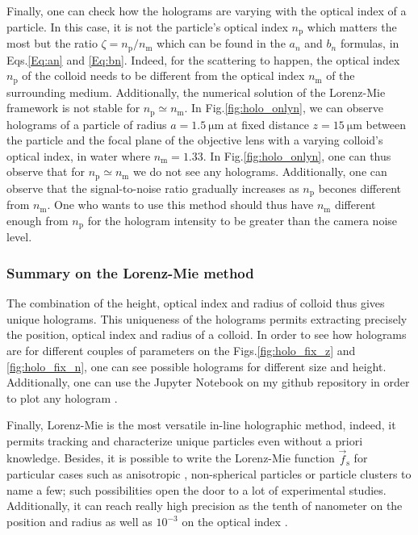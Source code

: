 Finally, one can check how the holograms are varying with the optical index of a particle. In this case, it is not the particle's optical index $n_\mathrm{p}$ which matters the most but the ratio $\zeta = n_\mathrm{p} / n_\mathrm{m} $ which can be found in the $a_n$ and $b_n$ formulas, in Eqs.\ref{Eq:an} and \ref{Eq:bn}. Indeed, for the scattering to happen, the optical index $n_\mathrm{p}$ of the colloid needs to be different from the optical index $n_\mathrm{m}$ of the surrounding medium. Additionally, the numerical solution of the Lorenz-Mie framework is not stable for $n_\mathrm{p} \simeq n_\mathrm{m}$. In Fig.\ref{fig:holo_onlyn}, we can observe holograms of a particle of radius $a = 1.5 ~ \mathrm{\mu m}$ at fixed distance $z=15 ~ \mathrm{\mu m}$ between the particle and the focal plane of the objective lens with a varying colloid's optical index, in water where $n_\mathrm{m} = 1.33$. In Fig.\ref{fig:holo_onlyn}, one can thus observe that for  $n_\mathrm{p} \simeq n_\mathrm{m}$ we do not see any holograms.  Additionally, one can observe that the signal-to-noise ratio gradually increases as $n_\mathrm{p}$ becones different from $n_\mathrm{m}$. One who wants to use this method should thus have $n_\mathrm{m}$ different enough from $n_\mathrm{p}$ for the hologram intensity to be greater than the camera noise level.






\subsubsection{Summary on the Lorenz-Mie method}

The combination of the height, optical index and radius of colloid thus gives unique holograms. This uniqueness of the holograms permits extracting precisely the position, optical index and radius of a colloid. In order to see how holograms are for different couples of parameters on the Figs.\ref{fig:holo_fix_z} and \ref{fig:holo_fix_n}, one can see possible holograms for different size and height. Additionally, one can use  the Jupyter Notebook on my github repository in order to plot any hologram \href{https://github.com/eXpensia/Ma-these/blob/main/02_body/chapter2/images/holo_size_exemple/holosize_variation.ipynb}{\faGithub}.  

Finally, Lorenz-Mie is the most versatile in-line holographic method, indeed, it permits tracking and characterize unique particles even without a priori knowledge. Besides, it is possible to write the Lorenz-Mie function $\vec{f}_\mathrm{s}$ for particular cases such as anisotropic \cite{fung_holographic_2013}, non-spherical particles \cite{wang_using_2014} or particle clusters \cite{fung_holographic_2013, perry_real-space_2013} to name a few; such possibilities open the door to a lot of experimental studies. Additionally, it can reach really high precision as the tenth of nanometer on the position and radius as well as $10^{-3}$ on the optical index \cite{lee_characterizing_2007}. 

